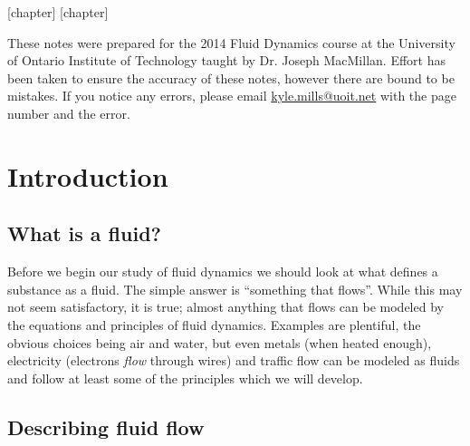 \documentclass[12pt]{book}
\begin{document}
\clearpage \mbox{}
\thispagestyle{empty}

\newpage

[chapter]
[chapter]

\vspace*{10em}
These notes were prepared for the 2014 Fluid Dynamics course at the University of Ontario Institute of Technology taught by Dr. Joseph MacMillan.  Effort has been taken to ensure the accuracy of these notes, however there are bound to be mistakes. If you notice any errors, please email \url{kyle.mills@uoit.net} with the page number and the error.
\vfill
\clearpage


\newpage
\tableofcontents
\newpage
\chapter{Introduction}
\section{What is a fluid?}
Before we begin our study of fluid dynamics we should look at what defines a substance as a fluid.  The simple answer is ``something that flows''.  While this may not seem satisfactory, it is true; almost anything that flows can be modeled by the equations and principles of fluid dynamics.  Examples are plentiful, the obvious choices being air and water, but even metals (when heated enough), electricity (electrons \textit{flow} through wires) and traffic flow can be modeled as fluids and follow at least some of the principles which we will develop.


\section{Describing fluid flow}
\end{document}
